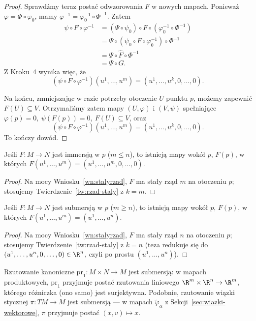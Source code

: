 \begin{proof}
Sprawdźmy teraz postać odwzorowania $F$ w nowych mapach.
Ponieważ $\varphi = \Phi\circ\varphi_0$,
mamy $\varphi^{-1} = \varphi_0^{-1}\circ\Phi^{-1}$.
Zatem
\begin{align*}
\psi\circ F\circ\varphi^{-1}
&=
(\Psi\circ\psi_0)
\circ F
\circ
(\varphi_0^{-1}\circ\Phi^{-1})\\
&=
\Psi
\circ
(\psi_0\circ F\circ\varphi_0^{-1})
\circ
\Phi^{-1}\\
&=
\Psi\circ\widehat F\circ\Phi^{-1}\\
&=
\Psi\circ G.
\end{align*}
Z Kroku~4 wynika więc, że
\[
(\psi\circ F\circ\varphi^{-1}) (u^1,\dots,u^m) = (u^1,\dots,u^k,0,\dots,0).
\]

Na końcu, zmniejszając w razie potrzeby otoczenie $U$ punktu $p$,
możemy zapewnić $F(U)\subseteq V$.
Otrzymaliśmy zatem mapy $(U,\varphi)$ i $(V,\psi)$ spełniające $\varphi(p)=0, \ \psi(F(p))=0, \ F(U)\subseteq V$,
oraz
\[
\boxed{ (\psi\circ F\circ\varphi^{-1})(u^1,\dots,u^m) = (u^1,\dots,u^k,0,\dots,0). }
\]
To kończy dowód.
\end{proof}

\begin{wniosek}\label{wn:immersja-lokalnie}
Jeśli $F\colon M\to N$ jest immersją w $p$ ($m\leq n$), to istnieją mapy wokół $p$, $F(p)$,
w których $F(u^1,\dots,u^m)=(u^1,\dots,u^m,0,\dots,0)$.
\end{wniosek}
\begin{proof}
Na mocy Wniosku~\ref{wn:stalyrzad}, $F$ ma stały rząd $m$ na otoczeniu $p$; stosujemy
Twierdzenie~\ref{tw:rzad-staly} z $k=m$.
\end{proof}

\begin{wniosek}\label{wn:submersja-lokalnie}
Jeśli $F\colon M\to N$ jest submersją w $p$ ($m\geq n$), to istnieją mapy wokół $p$, $F(p)$,
w których $F(u^1,\dots,u^m)=(u^1,\dots,u^n)$.
\end{wniosek}
\begin{proof}
Na mocy Wniosku~\ref{wn:stalyrzad}, $F$ ma stały rząd $n$ na otoczeniu $p$; stosujemy
Twierdzenie~\ref{tw:rzad-staly} z $k=n$ (teza redukuje się do $(u^1,\dots,u^n,0,\dots,0)\in
\R^n$, czyli po prostu $(u^1,\dots,u^n)$).
\end{proof}

\begin{przyklad}
Rzutowanie kanoniczne $\mathrm{pr}_1\colon M\times N\to M$ jest submersją: w mapach
produktowych, $\mathrm{pr}_1$ przyjmuje postać rzutowania liniowego $\R^m\times\R^n\to
\R^m$, którego różniczka (ono samo) jest surjektywna. Podobnie, rzutowanie wiązki
stycznej $\pi\colon TM\to M$ jest submersją — w mapach $\tilde\varphi_\alpha$ z Sekcji~\ref{sec:wiazki-wektorowe},
$\pi$ przyjmuje postać $(x,v)\mapsto x$.
\end{przyklad}

